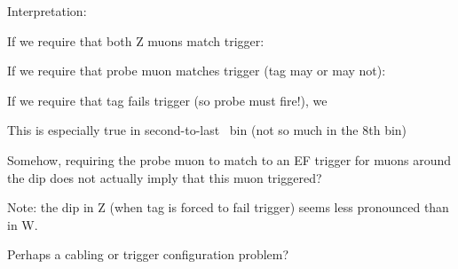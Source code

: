  {
Interpretation:
\iteb
\item If we require that both Z muons match trigger: 
\item If we require that probe muon matches trigger (tag may or may not): 
\item If we require that tag fails trigger (so probe must fire!), we 
\item This is especially true in second-to-last \eta\ bin (not so much in the 8th bin)
\iteb
\item Somehow, requiring the probe muon to match to an EF trigger for muons around the dip  does not actually imply that this muon triggered?
\item Note: the dip in Z (when tag is forced to fail trigger) seems less pronounced than in W.
\item Perhaps a cabling or trigger configuration problem?
\itee
\itee
}

